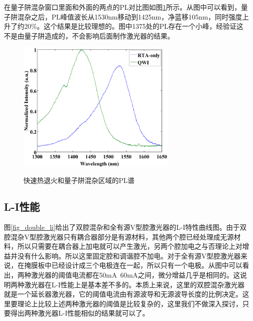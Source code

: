 \documentclass{ZJUthesis}
\begin{document}
在量子阱混杂窗口里面和外面的两点的PL对比图如图\ref{fig_double_pl4}所示。从图中可以看到，量子阱混杂之后，PL峰值波长从1530nm移动到1425nm，净蓝移105nm，同时强度上升了约20\%。这个结果是比较理想的。图中1375处的PL存在一个小峰，经验证这不是由量子阱造成的，不会影响后面制作激光器的结果。

\begin{figure}[!ht]
  \centering
  \includegraphics[width=0.7\textwidth]{./Pictures/double_pl4.eps}\\
  \caption{快速热退火和量子阱混杂区域的PL谱}
  \label{fig_double_pl4}
\end{figure}

\subsection{L-I性能}

图\ref{fig_double_li}给出了双腔混杂和全有源V型腔激光器的L-I特性曲线图。由于双腔混杂V型腔激光器只有耦合器部分是有源材料，其他两个腔已经处理成无源材料，所以只需要在耦合器上加电就可以产生激光，另两个腔加电之与否理论上对增益并没有什么影响。所以这里固定腔和调谐腔不加电。对于全有源V型腔激光器来说，在掩膜板中已经设计成三个电极连在一起，所以只有一个电极。从图中可以看出，两种激光器的阈值电流都在50mA~60mA之间，微分增益几乎是相同的。这说明两种激光器在L-I性能上是基本差不多的。本质上来说，这里的双腔混杂激光器就是一个延长器激光器，它的阈值电流由有源波导和无源波导长度的比例决定。这里要理论上比较上述两种激光器的阈值是比较复杂的，这里我们不做深入探讨，只要得出两种激光器L-I性能相似的结果就可以了。
\end{document}
